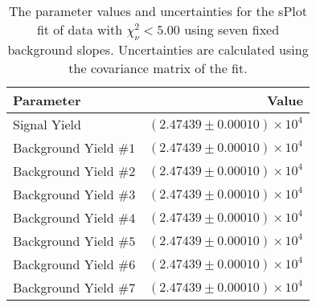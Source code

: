 
\begin{table}[ht]
    \begin{center}
        \begin{tabular}{lr}\toprule
            Parameter & Value \\\midrule
            Signal Yield & $(2.47439 \pm 0.00010) \times 10^{4}$ \\
            Background Yield $\#1$ & $(2.47439 \pm 0.00010) \times 10^{4}$ \\
            Background Yield $\#2$ & $(2.47439 \pm 0.00010) \times 10^{4}$ \\
            Background Yield $\#3$ & $(2.47439 \pm 0.00010) \times 10^{4}$ \\
            Background Yield $\#4$ & $(2.47439 \pm 0.00010) \times 10^{4}$ \\
            Background Yield $\#5$ & $(2.47439 \pm 0.00010) \times 10^{4}$ \\
            Background Yield $\#6$ & $(2.47439 \pm 0.00010) \times 10^{4}$ \\
            Background Yield $\#7$ & $(2.47439 \pm 0.00010) \times 10^{4}$ \\\bottomrule
        \end{tabular}
        \caption{The parameter values and uncertainties for the sPlot fit of data with $\chi^2_\nu < 5.00$ using seven fixed background slopes. Uncertainties are calculated using the covariance matrix of the fit.}\label{tab:splot-fit-results-chisqdof-5.00-fixed-7}
    \end{center}
\end{table}

